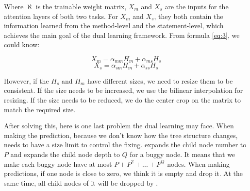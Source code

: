 Where $\aleph$ is the trainable weight matrix, $X_m$ and $X_s$ are the inputs for the attention layers of both two tasks. For $X_m$ and $X_s$, they both contain the information learned from the method-level and the statement-level, which achieves the main goal of the dual learning framework. From formula \ref{eq:3}, we could know:

\begin{equation}\label{eq:4}
	X_m = \alpha_{mm}H_m + \alpha_{ms}H_s
\end{equation}
\begin{equation}\label{eq:5}
	X_s = \alpha_{sm}H_m + \alpha_{ss}H_s
\end{equation}

However, if the $H_s$ and $H_m$ have different sizes, we need to resize them to be consistent. If the size needs to be increased, we use the bilinear interpolation for resizing. If the size needs to be reduced, we do the center crop on the matrix to match the required size.

After solving this, here is one last problem the dual learning may face. When making the prediction, because we don't know how the tree structure changes, \tool needs to have a size limit to control the fixing. \tool expands the child node number to $P$ and expands the child node depth to $Q$ for a buggy node. It means that we make each buggy node have at most $P+P^2+...+P^Q$ nodes. When making predictions, if one node is close to zero, we think it is empty and drop it. At the same time, all child nodes of it will be dropped by \tool.
